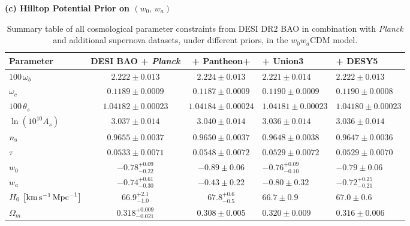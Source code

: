 \begin{subappendices}
\begin{table}[hb!]
	\textbf{(c) Hilltop Potential Prior on $(w_0,\,w_a)$}\\[4pt]
		\begingroup
		\renewcommand{\arraystretch}{1.05}
		\begin{tabularx}{\textwidth}{@{}>{\raggedright\arraybackslash}p{3.2cm} c c W W @{}}
			\toprule
			Parameter & DESI BAO + {\it Planck} & + Pantheon+ & + Union3 & + DESY5 \\
			\midrule[0.065em]
			$100\,\omega_b$ & $2.222 \pm 0.013$ & $2.224 \pm 0.013$ & $2.221 \pm 0.014$ & $2.222 \pm 0.013$ \\
			$\omega_c$ & $0.1189 \pm 0.0009$ & $0.1187 \pm 0.0009$ & $0.1190 \pm 0.0009$ & $0.1190 \pm 0.0008$ \\
			$100\,\theta_s$ & $1.04182 \pm 0.00023$ & $1.04184 \pm 0.00024$ & $1.04181 \pm 0.00023$ & $1.04180 \pm 0.00023$ \\
			$\ln\left(10^{10}A_s\right)$ & $3.037 \pm 0.014$ & $3.040 \pm 0.014$ & $3.036 \pm 0.014$ & $3.036 \pm 0.014$ \\
			$n_{\rm s}$ & $0.9655 \pm 0.0037$ & $0.9650 \pm 0.0037$ & $0.9648 \pm 0.0038$ & $0.9647 \pm 0.0036$ \\
			$\tau$ & $0.0533 \pm 0.0071$ & $0.0548 \pm 0.0072$ & $0.0529 \pm 0.0072$ & $0.0529 \pm 0.0070$ \\
			$w_0$ & $-0.78^{+0.09}_{-0.22}$ & $-0.89\pm 0.06$ & $-0.76^{+0.09}_{-0.10}$ & $-0.79\pm 0.06$ \\
			$w_a$ & $-0.74^{+0.61}_{-0.30}$ & $-0.43\pm 0.22$ & $-0.80\pm 0.32$ & $-0.72^{+0.25}_{-0.21}$ \\
			$H_0\,\left[{\rm km}\,{\rm s}^{-1}\,{\rm Mpc}^{-1}\right]$ & $66.9^{+2.1}_{-1.0}$ & $67.8^{+0.6}_{-0.5}$ & $66.7\pm 0.9$ & $67.0\pm 0.6$ \\
			$\Omega_m$ & $0.318^{+0.009}_{-0.021}$ & $0.308\pm 0.005$ & $0.320\pm 0.009$ & $0.316\pm 0.006$ \\
			\bottomrule
		\end{tabularx}
		\endgroup

	\caption[Full parameter constraints under all priors]{Summary table of all cosmological parameter constraints from DESI DR2 BAO in combination with {\it Planck} and additional supernova datasets, under different priors, in the $w_0 w_a$CDM model. }
	\label{tab:ch11-analysis_all}
\end{table}

\end{subappendices}
